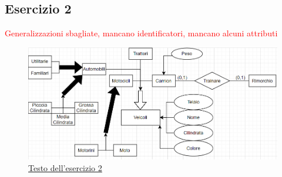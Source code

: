 \documentclass[10pt,twocolumn]{article}
\begin{document}
\subsection{Esercizio 2}
\textcolor{red}{Generalizzazioni sbagliate, mancano identificatori, mancano alcuni attributi}
\begin{figure}[htbp]
\centerline{\includegraphics{Es2.png}}
\caption{\href{run:./TestoEs2.txt}{Testo dell'esercizio 2}}
\label{fig}
\end{figure}
\end{document}
